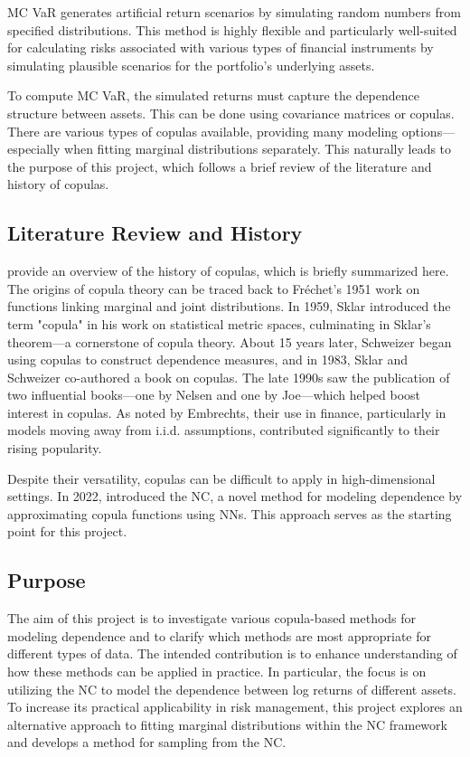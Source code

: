 \gls{MC} \gls{VaR} generates artificial return scenarios by simulating random numbers from specified distributions\footnotemark[\value{footnote}]. This method is highly flexible and particularly well-suited for calculating risks associated with various types of financial instruments by simulating plausible scenarios for the portfolio’s underlying assets.

To compute \gls{MC} \gls{VaR}, the simulated returns must capture the dependence structure between assets. This can be done using covariance matrices or copulas. There are various types of copulas available, providing many modeling options—especially when fitting marginal distributions separately. This naturally leads to the purpose of this project, which follows a brief review of the literature and history of copulas.

\subsection{Literature Review and History}\label{LiteratureReview}
 provide an overview of the history of copulas, which is briefly summarized here. The origins of copula theory can be traced back to Fréchet’s 1951 work on functions linking marginal and joint distributions. In 1959, Sklar introduced the term "copula" in his work on statistical metric spaces, culminating in Sklar’s theorem—a cornerstone of copula theory. About 15 years later, Schweizer began using copulas to construct dependence measures, and in 1983, Sklar and Schweizer co-authored a book on copulas. The late 1990s saw the publication of two influential books—one by Nelsen and one by Joe—which helped boost interest in copulas. As noted by Embrechts, their use in finance, particularly in models moving away from i.i.d. assumptions, contributed significantly to their rising popularity.

Despite their versatility, copulas can be difficult to apply in high-dimensional settings. In 2022,  introduced the \gls{NC}, a novel method for modeling dependence by approximating copula functions using \gls{NN}s. This approach serves as the starting point for this project.

\subsection{Purpose}\label{Purpose}
The aim of this project is to investigate various copula-based methods for modeling dependence and to clarify which methods are most appropriate for different types of data. The intended contribution is to enhance understanding of how these methods can be applied in practice. In particular, the focus is on utilizing the \gls{NC} to model the dependence between log returns of different assets. To increase its practical applicability in risk management, this project explores an alternative approach to fitting marginal distributions within the \gls{NC} framework and develops a method for sampling from the \gls{NC}. 


